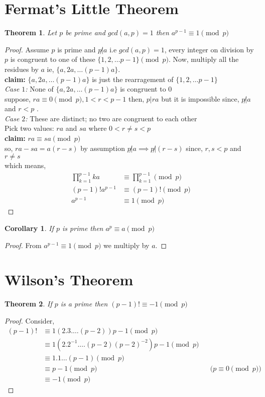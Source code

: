\documentclass[12pt,a4paper]{article}
\newtheorem{thm}{Theorem}
\newtheorem{cor}{Corollary}
\begin{document}
\section{Fermat's Little Theorem}
\begin{thm}
	Let $p$ be prime and $gcd(a,p)=1$ then $a^{p-1} \equiv 1 \pmod p$
\end{thm}
\begin{proof}
	Assume $p$ is prime and $p\not | a$ i.e $gcd(a,p)=1$, every integer on division by $p$ is congruent to one of these $\{1,2,\dots p-1\} \pmod p$. Now, multiply all the residues by $a$ ie, $\{a,2a,\dots (p-1)a\}$.\\ 
	\textbf{claim: } $\{a,2a,\dots (p-1)a\}$ is just the rearragement of $\{1,2,\dots p-1\}$\\
	\textit{Case $1$:} None of  $\{a,2a,\dots (p-1)a\}$ is congruent to $0$\\
	suppose, $ra \equiv 0 \pmod p, 1<r<p-1$ then, $p|ra$ but it is impossible since, $p\not | a$ and $r<p$ .\\
	\textit{Case $2$:} These are distinct; no two are congruent to each other\\
	Pick two values: $ra$ and $sa$ where $0<r \not = s <p$\\
	\textbf{claim:} $ra\equiv sa \pmod p$\\
	so, $ra-sa=a(r-s)$ by assumption $p\not | a \implies p\not | (r-s)$ since, $r,s<p$ and $r\not = s$\\
	which means,
	\begin{align*}
		\prod_{k=1}^{p-1} ka & \equiv \prod_{k=1}^{p-1} \pmod p \\
		(p-1)!a^{p-1} & \equiv (p-1)! \pmod p \\
		a^{p-1} & \equiv 1 \pmod p
	\end{align*}
\end{proof}
\begin{cor}
	If $p$ is prime then $a^{p} \equiv a \pmod p$
\end{cor}
\begin{proof}
	From $a^{p-1} \equiv 1 \pmod p$ we multiply by $a$.
\end{proof}
\section{Wilson's Theorem}
\begin{thm}
	If $p$ is a prime then $(p-1)! \equiv -1 \pmod p$ 
\end{thm}
\begin{proof}
	Consider,
	\begin{align*}
	(p-1)! & \equiv 1(2.3.\dots (p-2)) p-1 \pmod p \\
		& \equiv 1(2.2^{-1}.\dots (p-2)(p-2)^{-2}) p-1 \pmod p \\
		& \equiv 1.1\dots (p-1) \pmod p \\
		& \equiv p-1 \pmod p  && \text{($p \equiv 0 \pmod p$)} \\
		& \equiv -1 \pmod p 
	\end{align*}

\end{proof}
\end{document}
